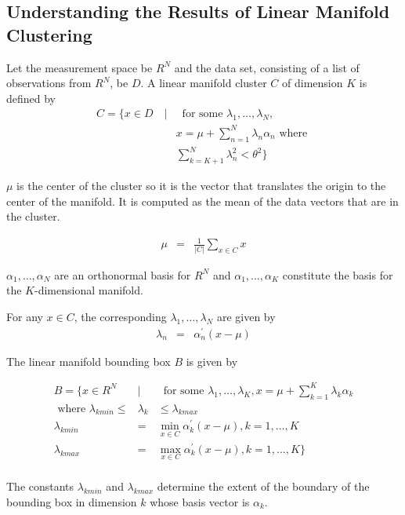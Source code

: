\subsection{Understanding the Results of Linear Manifold Clustering}
\label{ssec:lmclus-results}

Let the measurement space be $R^N$ and the data set, consisting of
a list of observations from $R^N$, be $D$. A linear manifold cluster
$C$ of dimension $K$ is defined by
\begin{eqnarray*}
C=\{x\in D\ &|&\ \mbox{ for some }\lambda_1,\ldots,\lambda_N,\\
 && x=\mu+\sum_{n=1}^N \lambda_n\alpha_n \mbox{ where }\\
&&      \sum_{k=K+1}^N \lambda_n^2 < \theta^2\}
\end{eqnarray*}

$\mu$ is the center of the cluster so it is the vector that translates
the origin to the center of the manifold. It is computed as the mean of the
data vectors that are in the cluster.

\begin{eqnarray*}
\mu&=&\frac{1}{|C|}\sum_{x\in C} x
\end{eqnarray*}


$\alpha_1,\ldots,\alpha_N$ are an orthonormal basis for $R^N$ and
$\alpha_1,\ldots,\alpha_K$ constitute the basis for the $K$-dimensional
manifold.

For any $x\in C$, the corresponding $\lambda_1,\ldots,\lambda_N$ are given
by
\begin{eqnarray*}
\lambda_n&=&\alpha_n^\prime(x-\mu)
\end{eqnarray*}

The linear manifold bounding box $B$ is given by

\begin{eqnarray*}
B=\{x\in R^N\ &|&\ \mbox{ for some } \lambda_1,\ldots,\lambda_K,
 x=\mu+\sum_{k=1}^K \lambda_k\alpha_k \\
 \mbox{ where }\lambda_{kmin}\le&\lambda_k& \le \lambda_{kmax} \\
\lambda_{kmin}&=&\min_{x\in C} \alpha_k^\prime(x-\mu), k=1,\ldots,K\\
\lambda_{kmax}&=&\max_{x\in C} \alpha_k^\prime(x-\mu), k=1,\ldots,K\}\\
\end{eqnarray*}

The constants $\lambda_{kmin}$ and $\lambda_{kmax}$ determine the extent
of the boundary of the bounding box in dimension $k$ whose basis vector is $\alpha_k$.

